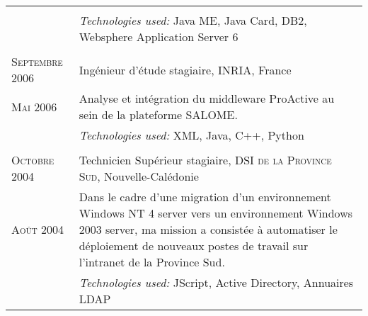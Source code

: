 \begin{longtable}{R{2.5cm}|p{14.8cm}}
{\begin{itemize}
		\end{itemize}
		\vspace{-1em}
	}\\&
 	\footnotesize{\emph{Technologies used:} Java ME, Java Card, DB2, Websphere Application Server 6 }\\
   \\
  	\textsc{Septembre 2006} & Ingénieur d'étude stagiaire, \textsc{INRIA}, France\\
  	\textsc{Mai 2006}&\footnotesize{Analyse et intégration du middleware ProActive au sein de la plateforme SALOME.}\\&
  	\footnotesize{\emph{Technologies used:} XML, Java, C++, Python}\\
  \\
 	\textsc{Octobre 2004} & Technicien Supérieur stagiaire, \textsc{DSI de la Province Sud}, Nouvelle-Calédonie\\
 	\textsc{Août 2004}&\footnotesize{Dans le cadre d'une migration d'un environnement Windows NT 4 server vers un environnement Windows 
 	2003 server, ma mission a consistée à automatiser le déploiement de nouveaux postes de travail sur l'intranet de la Province Sud. }\\&
 	\footnotesize{\emph{Technologies used:} JScript, Active Directory, Annuaires LDAP}\\
\end{longtable}